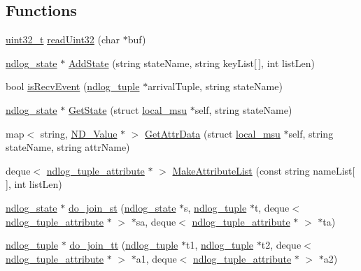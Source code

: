 \subsection*{Functions}
\begin{DoxyCompactItemize}
\item 
\hyperlink{msus_2webserver_2uthash_8h_a435d1572bf3f880d55459d9805097f62}{uint32\-\_\-t} \hyperlink{helper-function_8cc_aadd03fb3a74f1cdecd87bbd2a18a6788}{read\-Uint32} (char $\ast$buf)
\item 
\hyperlink{structndlog__state}{ndlog\-\_\-state} $\ast$ \hyperlink{helper-function_8cc_a8ac805dfecdda56f489a52689df50955}{Add\-State} (string state\-Name, string key\-List\mbox{[}$\,$\mbox{]}, int list\-Len)
\item 
bool \hyperlink{helper-function_8cc_a1ef30aab6706faf1972bbc3ce2df03d3}{is\-Recv\-Event} (\hyperlink{structndlog__tuple}{ndlog\-\_\-tuple} $\ast$arrival\-Tuple, string state\-Name)
\item 
\hyperlink{structndlog__state}{ndlog\-\_\-state} $\ast$ \hyperlink{helper-function_8cc_a0ab06924c91416c26f84e4bf50c0a367}{Get\-State} (struct \hyperlink{structlocal__msu}{local\-\_\-msu} $\ast$self, string state\-Name)
\item 
map$<$ string, \hyperlink{class_n_d___value}{N\-D\-\_\-\-Value} $\ast$ $>$ \hyperlink{helper-function_8cc_a2e7b86789b841df071507f7d301b16ea}{Get\-Attr\-Data} (struct \hyperlink{structlocal__msu}{local\-\_\-msu} $\ast$self, string state\-Name, string attr\-Name)
\item 
deque$<$ \hyperlink{structndlog__tuple__attribute}{ndlog\-\_\-tuple\-\_\-attribute} $\ast$ $>$ \hyperlink{helper-function_8cc_a949644440d7002f63f57c4d249e936f6}{Make\-Attribute\-List} (const string name\-List\mbox{[}$\,$\mbox{]}, int list\-Len)
\item 
\hyperlink{structndlog__state}{ndlog\-\_\-state} $\ast$ \hyperlink{helper-function_8cc_a5e335a6a9e3ded6bc49fcb946241a3f6}{do\-\_\-join\-\_\-st} (\hyperlink{structndlog__state}{ndlog\-\_\-state} $\ast$s, \hyperlink{structndlog__tuple}{ndlog\-\_\-tuple} $\ast$t, deque$<$ \hyperlink{structndlog__tuple__attribute}{ndlog\-\_\-tuple\-\_\-attribute} $\ast$ $>$ $\ast$sa, deque$<$ \hyperlink{structndlog__tuple__attribute}{ndlog\-\_\-tuple\-\_\-attribute} $\ast$ $>$ $\ast$ta)
\item 
\hyperlink{structndlog__tuple}{ndlog\-\_\-tuple} $\ast$ \hyperlink{helper-function_8cc_a3af4d8ab83a55e09c7258f92b6ba3f6b}{do\-\_\-join\-\_\-tt} (\hyperlink{structndlog__tuple}{ndlog\-\_\-tuple} $\ast$t1, \hyperlink{structndlog__tuple}{ndlog\-\_\-tuple} $\ast$t2, deque$<$ \hyperlink{structndlog__tuple__attribute}{ndlog\-\_\-tuple\-\_\-attribute} $\ast$ $>$ $\ast$a1, deque$<$ \hyperlink{structndlog__tuple__attribute}{ndlog\-\_\-tuple\-\_\-attribute} $\ast$ $>$ $\ast$a2)

\end{DoxyCompactItemize}
